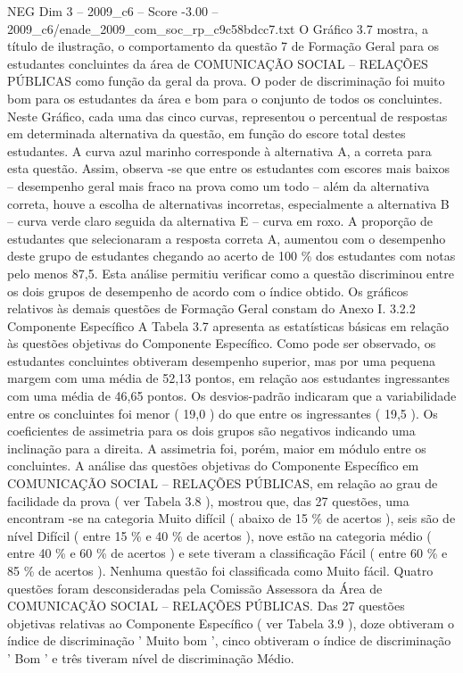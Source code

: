 \begin{textsample}{NEG Dim 3 – 2009\_c6 – Score -3.00 – 2009\_c6/enade\_2009\_com\_soc\_rp\_c9c58bdcc7.txt}
O Gráfico 3.7 mostra, a título de ilustração, o comportamento da questão 7 de Formação Geral para os estudantes concluintes da área de COMUNICAÇÃO SOCIAL – RELAÇÕES PÚBLICAS como função da geral da prova.
O poder de discriminação foi muito bom para os estudantes da área e bom para o conjunto de todos os concluintes.
Neste Gráfico, cada uma das cinco curvas, representou o percentual de respostas em determinada alternativa da questão, em função do escore total destes estudantes.
A curva azul marinho corresponde à alternativa A, a correta para esta questão.
Assim, observa -se que entre os estudantes com escores mais baixos – desempenho geral mais fraco na prova como um todo – além da alternativa correta, houve a escolha de alternativas incorretas, especialmente a alternativa B – curva verde claro seguida da alternativa E – curva em roxo.
A proporção de estudantes que selecionaram a resposta correta A, aumentou com o desempenho deste grupo de estudantes chegando ao acerto de 100 \% dos estudantes com notas pelo menos 87,5.
Esta análise permitiu verificar como a questão discriminou entre os dois grupos de desempenho de acordo com o índice obtido.
Os gráficos relativos às demais questões de Formação Geral constam do Anexo I. 3.2.2 Componente Específico A Tabela 3.7 apresenta as estatísticas básicas em relação às questões objetivas do Componente Específico.
Como pode ser observado, os estudantes concluintes obtiveram desempenho superior, mas por uma pequena margem com uma média de 52,13 pontos, em relação aos estudantes ingressantes com uma média de 46,65 pontos.
Os desvios-padrão indicaram que a variabilidade entre os concluintes foi menor ( 19,0 ) do que entre os ingressantes ( 19,5 ).
Os coeficientes de assimetria para os dois grupos são negativos indicando uma inclinação para a direita.
A assimetria foi, porém, maior em módulo entre os concluintes.
A análise das questões objetivas do Componente Específico em COMUNICAÇÃO SOCIAL – RELAÇÕES PÚBLICAS, em relação ao grau de facilidade da prova ( ver Tabela 3.8 ), mostrou que, das 27 questões, uma encontram -se na categoria Muito difícil ( abaixo de 15 \% de acertos ), seis são de nível Difícil ( entre 15 \% e 40 \% de acertos ), nove estão na categoria médio ( entre 40 \% e 60 \% de acertos ) e sete tiveram a classificação Fácil ( entre 60 \% e 85 \% de acertos ).
Nenhuma questão foi classificada como Muito fácil.
Quatro questões foram desconsideradas pela Comissão Assessora da Área de COMUNICAÇÃO SOCIAL – RELAÇÕES PÚBLICAS.
Das 27 questões objetivas relativas ao Componente Específico ( ver Tabela 3.9 ), doze obtiveram o índice de discriminação ' Muito bom ', cinco obtiveram o índice de discriminação ' Bom ' e três tiveram nível de discriminação Médio.

\end{textsample}
